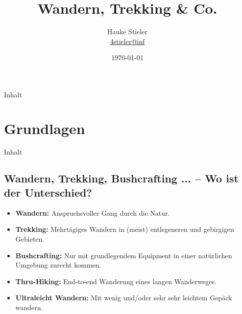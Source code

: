 \documentclass[aspectratio=169]{beamer}
\author[Hauke Stieler]{Hauke Stieler\\\href{mailto:4stieler@informatik.uni-hamburg.de}{4stieler@inf}}
\title{Wandern, Trekking \& Co.}
\date{\today}
\begin{document}
	{
		\maketitle
		\addtocounter{page}{-1}
	}
	
	\begin{frame}[t]{Inhalt}
	\tableofcontents[hidesubsections]
	\end{frame}
	
	\section{Grundlagen}
		
		\begin{frame}[t]{Inhalt}
		\end{frame}
	
		\subsection{Wandern, Trekking, Bushcrafting ... -- Wo ist der Unterschied?}
		
			\begin{frame}{}
				\begin{itemize}
					\item \textbf{Wandern:} Anspruchsvoller Gang durch die Natur.\pause
					\item \textbf{Trekking:} Mehrtägiges Wandern in (meist) entlegeneren und gebirgigen Gebieten.\pause
					\item \textbf{Bushcrafting:} Nur mit grundlegendem Equipment in einer natürlichen Umgebung zurecht kommen.\pause
					\item \textbf{Thru-Hiking:} End-to-end Wanderung eines langen Wanderweges.\pause
					\item \textbf{Ultraleicht Wandern:} Mit wenig und/oder sehr sehr leichtem Gepäck wandern.
				\end{itemize}
			\end{frame}
		
\end{document}

